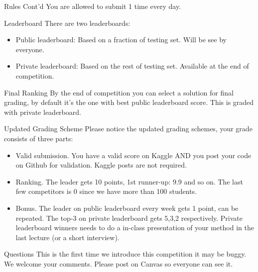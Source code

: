 \documentclass{beamer}
\begin{document}
	\begin{frame}{Rules Cont'd}
	You are allowed to submit 1 time every day. 
	
	\begin{block}{Leaderboard}
	There are two leaderboards:
	\begin{itemize}
		\item Public leaderboard: Based on a fraction of testing set. Will be see by everyone.
		\item Private leaderboard: Based on the rest of testing set. Available at the end of competition.
	\end{itemize}	
	
	\end{block}
	
	\begin{alertblock}{Final Ranking}
	By the end of competition you can select a solution for final grading, by default it's the one with best public leaderboard score. This is graded with private leaderboard.	
	\end{alertblock}
	\end{frame}

	\begin{frame}{Updated Grading Scheme}
	Please notice the updated grading schemes, your grade consists of three parts:
	\begin{itemize}
		\item Valid submission. You have a valid score on Kaggle AND you post your code on Github for validation. Kaggle posts are not required.
		\item Ranking. The leader gets 10 points, 1st runner-up: 9.9 and so on. The last few competitors is 0 since we have more than 100 students.
		\item Bonus. The leader on public leaderboard every week gets 1 point, can be repeated. The top-3 on private leaderboard gets 5,3,2 respectively. Private leaderboard winners needs to do a in-class presentation of your method in the last lecture (or a short interview).
	\end{itemize}
	\end{frame}
	
	\begin{frame}{Questions}
	This is the first time we introduce this competition it may be buggy. We welcome your comments. Please post on Canvas so everyone can see it. 
	\end{frame}
\end{document}
